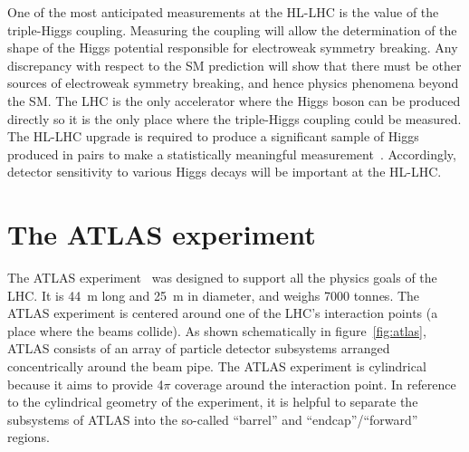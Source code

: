 One of the most anticipated measurements at the HL-LHC is the value of the triple-Higgs coupling. Measuring the coupling will allow the determination of the shape of the Higgs potential responsible for electroweak symmetry breaking. Any discrepancy with respect to the SM prediction will show that there must be other sources of electroweak symmetry breaking, and hence physics phenomena beyond the SM. The LHC is the only accelerator where the Higgs boson can be produced directly so it is the only place where the triple-Higgs coupling could be measured. The HL-LHC upgrade is required to produce a significant sample of Higgs produced in pairs to make a statistically meaningful measurement~\cite{dainese_physics_2018, cepeda_report_2018}. Accordingly, detector sensitivity to various Higgs decays will be important at the HL-LHC.


\section{The ATLAS experiment}
\label{sec:atlas}

The ATLAS experiment~\cite{collaboration_atlas_2008} was designed to support all the physics goals of the LHC. It is \SI{44}{\meter} long and \SI{25}{\meter} in diameter, and weighs 7000 tonnes. The ATLAS experiment is centered around one of the LHC's interaction points (a place where the beams collide). As shown schematically in figure~\ref{fig:atlas}, ATLAS consists of an array of particle detector subsystems arranged concentrically around the beam pipe.  The ATLAS experiment is cylindrical because it aims to provide 4$\pi$ coverage around the interaction point. In reference to the cylindrical geometry of the experiment, it is helpful to separate the subsystems of ATLAS into the so-called ``barrel'' and ``endcap''/``forward'' regions.

